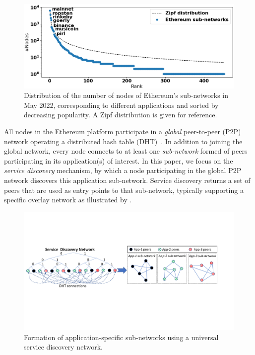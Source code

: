 \begin{figure}[t]
    \includegraphics[width=1\linewidth]{img/ecosystem}
    \vspace{-0.15in}
    \caption{Distribution of the number of nodes of Ethereum's sub-networks in May 2022, corresponding to different applications and sorted by decreasing popularity.
    A Zipf distribution is given for reference.
    }
    \vspace{-0.20in}
    \label{fig:ecosystem}
\end{figure}

All nodes in the Ethereum platform participate in a \emph{global} peer-to-peer (P2P) network operating a distributed hash table (DHT)~\cite{maymounkov2002kademlia}.
In addition to joining the global network, every node connects to at least one \emph{sub-network} formed of peers participating in its application(s) of interest.
In this paper, we focus on the \emph{service discovery} mechanism, by which a node participating in the global P2P network discovers this application sub-network.
Service discovery returns a set of peers that are used as entry points to that sub-network, typically supporting a specific overlay network as illustrated by .

\begin{figure}[b!]
    \includegraphics[width=1\linewidth]{img/subnetwork}
    \vspace{-0.15in}
    \caption{Formation of application-specific sub-networks using a universal service discovery network.
    \protect{}
    }
    \label{fig:subnetwork}
    \vspace{-0.15in}
\end{figure}


